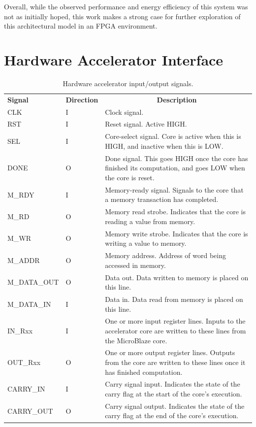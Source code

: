 \documentclass{UoYCSproject}
\begin{document}
Overall, while the observed performance and energy efficiency of this system was not as initially hoped,
this work makes a strong case for further exploration of this architectural model in an FPGA environment.

\appendix

\chapter{Hardware Accelerator Interface}
\label{appendix:interface}

\begin{table}[H]
\centering
\begin{tabular}{ |p{3cm}|p{2cm}|p{8cm}| }
\textbf{Signal} & \textbf{Direction} & \multicolumn{1}{c}{\textbf{Description}} \\
CLK             & I                  & Clock signal. \\[0.05cm]
RST             & I                  & Reset signal. Active HIGH. \\[0.05cm]
SEL             & I                  & Core-select signal. Core is active when this is HIGH, and inactive when this is LOW. \\[0.05cm]
DONE            & O                  & Done signal. This goes HIGH once the core has finished its computation, and goes LOW when the core is reset. \\[0.05cm]
M\_RDY          & I                  & Memory-ready signal. Signals to the core that a memory transaction has completed. \\[0.05cm]
M\_RD           & O                  & Memory read strobe. Indicates that the core is reading a value from memory. \\[0.05cm]
M\_WR           & O                  & Memory write strobe. Indicates that the core is writing a value to memory. \\[0.05cm]
M\_ADDR         & O                  & Memory address. Address of word being accessed in memory. \\[0.05cm]
M\_DATA\_OUT    & O                  & Data out. Data written to memory is placed on this line. \\[0.05cm]
M\_DATA\_IN     & I                  & Data in. Data read from memory is placed on this line. \\[0.05cm]
IN\_Rxx         & I                  & One or more input register lines. Inputs to the accelerator core are written to these lines from the MicroBlaze core. \\[0.05cm]
OUT\_Rxx        & O                  & One or more output register lines. Outputs from the core are written to these lines once it has finished computation. \\[0.05cm]
CARRY\_IN       & I                  & Carry signal input. Indicates the state of the carry flag at the start of the core's execution. \\[0.05cm]
CARRY\_OUT      & O                  & Carry signal output. Indicates the state of the carry flag at the end of the core's execution.
\end{tabular}
\caption{Hardware accelerator input/output signals.}
\label{table:acceleratorSignals}
\end{table}
\end{document}
